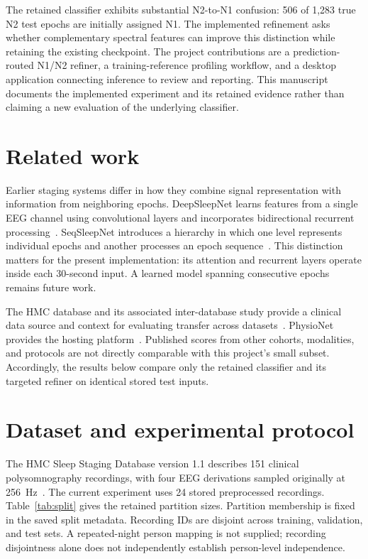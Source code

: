 \documentclass[pdflatex,sn-mathphys-num]{sn-jnl}
\begin{document}
The retained classifier exhibits substantial N2-to-N1 confusion: 506 of 1,283 true N2 test epochs are initially assigned N1. The implemented refinement asks whether complementary spectral features can improve this distinction while retaining the existing checkpoint. The project contributions are a prediction-routed N1/N2 refiner, a training-reference profiling workflow, and a desktop application connecting inference to review and reporting. This manuscript documents the implemented experiment and its retained evidence rather than claiming a new evaluation of the underlying classifier.

\section{Related work}\label{sec:related}
Earlier staging systems differ in how they combine signal representation with information from neighboring epochs. DeepSleepNet learns features from a single EEG channel using convolutional layers and incorporates bidirectional recurrent processing~\cite{supratak2017}. SeqSleepNet introduces a hierarchy in which one level represents individual epochs and another processes an epoch sequence~\cite{phan2019}. This distinction matters for the present implementation: its attention and recurrent layers operate inside each 30-second input. A learned model spanning consecutive epochs remains future work.

The HMC database and its associated inter-database study provide a clinical data source and context for evaluating transfer across datasets~\cite{hmc2022,alvarez2021}. PhysioNet provides the hosting platform~\cite{pollard2026}. Published scores from other cohorts, modalities, and protocols are not directly comparable with this project's small subset. Accordingly, the results below compare only the retained classifier and its targeted refiner on identical stored test inputs.

\section{Dataset and experimental protocol}\label{sec:data}
The HMC Sleep Staging Database version 1.1 describes 151 clinical polysomnography recordings, with four EEG derivations sampled originally at 256~Hz~\cite{hmc2022}. The current experiment uses 24 stored preprocessed recordings. Table~\ref{tab:split} gives the retained partition sizes. Partition membership is fixed in the saved split metadata. Recording IDs are disjoint across training, validation, and test sets. A repeated-night person mapping is not supplied; recording disjointness alone does not independently establish person-level independence.
\end{document}
